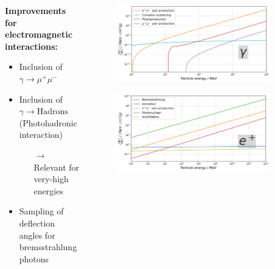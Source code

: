 \begin{frame}

\begin{columns}[onlytextwidth]
    \begin{column}{0.45\textwidth}
    	\textbf{Improvements for electromagnetic interactions:}
    	\begin{itemize}
    		\item Inclusion of $\gamma \to \mu^+ \mu^-$
    		\item Inclusion of $\gamma \to \text{Hadrons}$ \\(Photohadronic interaction)
            \begin{itemize}
                \item[$\rightarrow$] Relevant for very-high energies
            \end{itemize}
    		\item Sampling of deflection angles for bremsstrahlung photons
    	\end{itemize}


    \end{column}
    \begin{column}{0.55\textwidth}

    \begin{figure}
    	\centering
        \includegraphics[width=0.9\textwidth]{plots/photon_dEdx.png}
    \end{figure}
    \vspace{-3mm}
    \begin{figure}
        \centering
        \includegraphics[width=0.9\textwidth]{plots/positron_dEdx.png}
    \end{figure}


\end{column}
\end{columns}
\end{frame}
